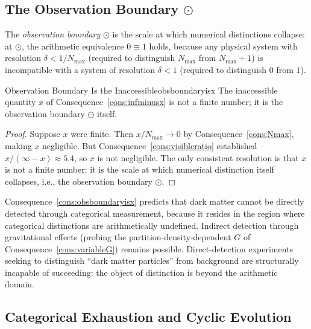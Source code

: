 \subsection{The Observation Boundary $\odot$}

\begin{definition}\label{def:obsboundary}
The \emph{observation boundary} $\odot$ is the scale at which numerical
distinctions collapse: at $\odot$, the arithmetic equivalence $0 \equiv 1$ holds,
because any physical system with resolution $\delta < 1/N_{\max}$ (required to
distinguish $N_{\max}$ from $N_{\max}+1$) is incompatible with a system of
resolution $\delta < 1$ (required to distinguish $0$ from $1$).
\end{definition}

\begin{consequence}{Observation Boundary Is the Inaccessible}{obsboundaryisx}
  The inaccessible quantity $x$ of Consequence~\ref{cons:infminusx} is not a
  finite number; it is the observation boundary $\odot$ itself.
\end{consequence}

\begin{proof}
Suppose $x$ were finite.
Then $x/N_{\max} \to 0$ by Consequence~\ref{cons:Nmax}, making $x$ negligible.
But Consequence~\ref{cons:visibleratio} established $x/(\infty - x) \approx 5.4$,
so $x$ is not negligible.
The only consistent resolution is that $x$ is not a finite number: it is the
scale at which numerical distinction itself collapses, i.e., the observation
boundary $\odot$.
\end{proof}

\begin{remark}
Consequence~\ref{cons:obsboundaryisx} predicts that dark matter cannot be
directly detected through categorical measurement, because it resides in the
region where categorical distinctions are arithmetically undefined.
Indirect detection through gravitational effects (probing the
partition-density-dependent $G$ of Consequence~\ref{cons:variableG}) remains
possible.
Direct-detection experiments seeking to distinguish ``dark matter particles''
from background are structurally incapable of succeeding: the object of
distinction is beyond the arithmetic domain.
\end{remark}

\subsection{Categorical Exhaustion and Cyclic Evolution}

